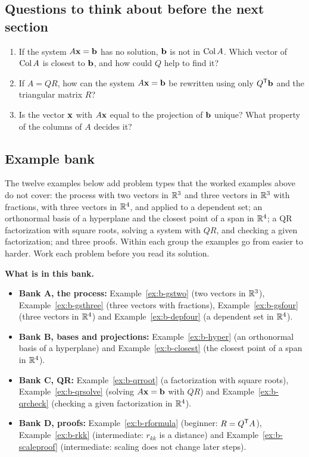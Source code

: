 \documentclass[11pt]{article}
\begin{document}
\subsection*{Questions to think about before the next section}
\begin{enumerate}[nosep]
  \item If the system $A\mathbf{x}=\mathbf{b}$ has no solution, $\mathbf{b}$ is not in $\operatorname{Col} A$. Which vector of $\operatorname{Col} A$ is closest to $\mathbf{b}$, and how could $Q$ help to find it?
  \item If $A=QR$, how can the system $A\mathbf{x}=\mathbf{b}$ be rewritten using only $Q^{\mathsf T}\mathbf{b}$ and the triangular matrix $R$?
  \item Is the vector $\mathbf{x}$ with $A\mathbf{x}$ equal to the projection of $\mathbf{b}$ unique? What property of the columns of $A$ decides it?
\end{enumerate}

\subsection*{Example bank}
The twelve examples below add problem types that the worked examples above do not cover: the process with two vectors in $\mathbb{R}^3$ and three vectors in $\mathbb{R}^3$ with fractions, with three vectors in $\mathbb{R}^4$, and applied to a dependent set; an orthonormal basis of a hyperplane and the closest point of a span in $\mathbb{R}^4$; a QR factorization with square roots, solving a system with $QR$, and checking a given factorization; and three proofs. Within each group the examples go from easier to harder. Work each problem before you read its solution.

\textbf{What is in this bank.}
\begin{itemize}
  \item \textbf{Bank A, the process:} Example~\ref{ex:b-gstwo} (two vectors in $\mathbb{R}^3$), Example~\ref{ex:b-gsthree} (three vectors with fractions), Example~\ref{ex:b-gsfour} (three vectors in $\mathbb{R}^4$) and Example~\ref{ex:b-depfour} (a dependent set in $\mathbb{R}^4$).
  \item \textbf{Bank B, bases and projections:} Example~\ref{ex:b-hyper} (an orthonormal basis of a hyperplane) and Example~\ref{ex:b-closest} (the closest point of a span in $\mathbb{R}^4$).
  \item \textbf{Bank C, QR:} Example~\ref{ex:b-qrroot} (a factorization with square roots), Example~\ref{ex:b-qrsolve} (solving $A\mathbf{x}=\mathbf{b}$ with $QR$) and Example~\ref{ex:b-qrcheck} (checking a given factorization in $\mathbb{R}^4$).
  \item \textbf{Bank D, proofs:} Example~\ref{ex:b-rformula} (beginner: $R=Q^{\mathsf T} A$), Example~\ref{ex:b-rkk} (intermediate: $r_{kk}$ is a distance) and Example~\ref{ex:b-scaleproof} (intermediate: scaling does not change later steps).
\end{itemize}
\end{document}
